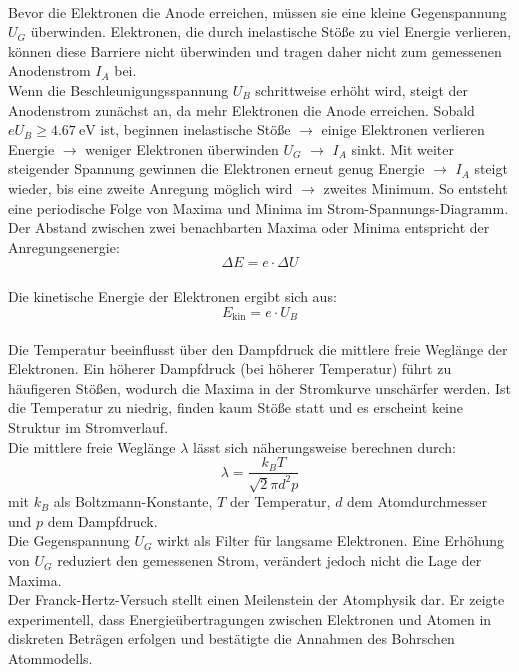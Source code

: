 \vspace{0.3cm}\\
Bevor die Elektronen die Anode erreichen, müssen sie eine kleine Gegenspannung $U_G$ überwinden. Elektronen, die durch inelastische Stöße zu viel Energie verlieren, können diese Barriere nicht überwinden und tragen daher nicht zum gemessenen Anodenstrom $I_A$ bei.
\vspace{0.3cm}\\
Wenn die Beschleunigungsspannung $U_B$ schrittweise erhöht wird, steigt der Anodenstrom zunächst an, da mehr Elektronen die Anode erreichen. Sobald $e U_B \geq \SI{4.67}{\electronvolt}$ ist, beginnen inelastische Stöße $\rightarrow$ einige Elektronen verlieren Energie $\rightarrow$ weniger Elektronen überwinden $U_G$ $\rightarrow$ $I_A$ sinkt. Mit weiter steigender Spannung gewinnen die Elektronen erneut genug Energie $\rightarrow$ $I_A$ steigt wieder, bis eine zweite Anregung möglich wird $\rightarrow$ zweites Minimum. So entsteht eine periodische Folge von Maxima und Minima im Strom-Spannungs-Diagramm.
\vspace{0.3cm}\\
Der Abstand zwischen zwei benachbarten Maxima oder Minima entspricht der Anregungsenergie:
\begin{equation}
\Delta E = e \cdot \Delta U
\end{equation}
\vspace{0.3cm}\\
Die kinetische Energie der Elektronen ergibt sich aus:
\begin{equation}
E_{\text{kin}} = e \cdot U_B
\end{equation}
\vspace{0.3cm}\\
Die Temperatur beeinflusst über den Dampfdruck die mittlere freie Weglänge der Elektronen. Ein höherer Dampfdruck (bei höherer Temperatur) führt zu häufigeren Stößen, wodurch die Maxima in der Stromkurve unschärfer werden. Ist die Temperatur zu niedrig, finden kaum Stöße statt und es erscheint keine Struktur im Stromverlauf.
\vspace{0.3cm}\\
Die mittlere freie Weglänge $\lambda$ lässt sich näherungsweise berechnen durch:
\begin{equation}
\lambda = \frac{k_B T}{\sqrt{2} \pi d^2 p}
\end{equation}
mit $k_B$ als Boltzmann-Konstante, $T$ der Temperatur, $d$ dem Atomdurchmesser und $p$ dem Dampfdruck.
\vspace{0.3cm}\\
Die Gegenspannung $U_G$ wirkt als Filter für langsame Elektronen. Eine Erhöhung von $U_G$ reduziert den gemessenen Strom, verändert jedoch nicht die Lage der Maxima.
\vspace{0.3cm}\\
Der Franck-Hertz-Versuch stellt einen Meilenstein der Atomphysik dar. Er zeigte experimentell, dass Energieübertragungen zwischen Elektronen und Atomen in diskreten Beträgen erfolgen und bestätigte die Annahmen des Bohrschen Atommodells.

